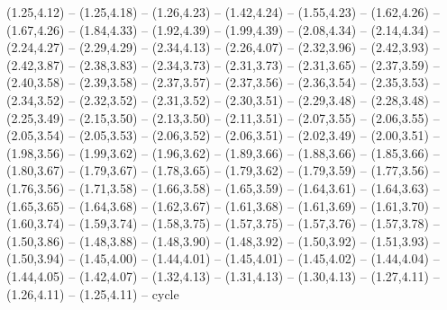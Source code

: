 \expandafter\def\csname geo:gebiet:DE-SL\endcsname{
  (1.25,4.12) -- (1.25,4.18) -- (1.26,4.23) -- (1.42,4.24) -- (1.55,4.23) -- (1.62,4.26) -- (1.67,4.26) -- (1.84,4.33) -- (1.92,4.39) -- (1.99,4.39) -- (2.08,4.34) -- (2.14,4.34) -- (2.24,4.27) -- (2.29,4.29) -- (2.34,4.13) -- (2.26,4.07) -- (2.32,3.96) -- (2.42,3.93) -- (2.42,3.87) -- (2.38,3.83) -- (2.34,3.73) -- (2.31,3.73) -- (2.31,3.65) -- (2.37,3.59) -- (2.40,3.58) -- (2.39,3.58) -- (2.37,3.57) -- (2.37,3.56) -- (2.36,3.54) -- (2.35,3.53) -- (2.34,3.52) -- (2.32,3.52) -- (2.31,3.52) -- (2.30,3.51) -- (2.29,3.48) -- (2.28,3.48) -- (2.25,3.49) -- (2.15,3.50) -- (2.13,3.50) -- (2.11,3.51) -- (2.07,3.55) -- (2.06,3.55) -- (2.05,3.54) -- (2.05,3.53) -- (2.06,3.52) -- (2.06,3.51) -- (2.02,3.49) -- (2.00,3.51) -- (1.98,3.56) -- (1.99,3.62) -- (1.96,3.62) -- (1.89,3.66) -- (1.88,3.66) -- (1.85,3.66) -- (1.80,3.67) -- (1.79,3.67) -- (1.78,3.65) -- (1.79,3.62) -- (1.79,3.59) -- (1.77,3.56) -- (1.76,3.56) -- (1.71,3.58) -- (1.66,3.58) -- (1.65,3.59) -- (1.64,3.61) -- (1.64,3.63) -- (1.65,3.65) -- (1.64,3.68) -- (1.62,3.67) -- (1.61,3.68) -- (1.61,3.69) -- (1.61,3.70) -- (1.60,3.74) -- (1.59,3.74) -- (1.58,3.75) -- (1.57,3.75) -- (1.57,3.76) -- (1.57,3.78) -- (1.50,3.86) -- (1.48,3.88) -- (1.48,3.90) -- (1.48,3.92) -- (1.50,3.92) -- (1.51,3.93) -- (1.50,3.94) -- (1.45,4.00) -- (1.44,4.01) -- (1.45,4.01) -- (1.45,4.02) -- (1.44,4.04) -- (1.44,4.05) -- (1.42,4.07) -- (1.32,4.13) -- (1.31,4.13) -- (1.30,4.13) -- (1.27,4.11) -- (1.26,4.11) -- (1.25,4.11) -- cycle}

